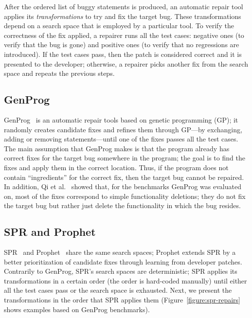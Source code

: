 After the ordered list of buggy statements is produced, an automatic repair tool applies its \emph{transformations} to try and fix the target bug. These transformations depend on a search space that is employed by a particular tool. To verify the correctness of the fix applied, a repairer runs all the test cases: negative ones (to verify that the bug is gone) and positive ones (to verify that no regressions are introduced). If the test cases pass, then the patch is considered correct and it is presented to the developer; otherwise, a repairer picks another fix from the search space and repeats the previous steps.

\subsection{GenProg}

GenProg~\cite{le2012systematic} is an automatic repair tools based on genetic programming (GP); it randomly creates candidate fixes and refines them through GP---by exchanging, adding or removing statements---until one of the fixes passes all the test cases. The main assumption that GenProg makes is that the program already has correct fixes for the target bug somewhere in the program; the goal is to find the fixes and apply them in the correct location. Thus, if the program does not contain ``ingredients'' for the correct fix, then the target bug cannot be repaired. In addition, Qi et al.~\cite{qi2015analysis} showed that, for the benchmarks GenProg was evaluated on, most of the fixes correspond to simple functionality deletions; they do not fix the target bug but rather just delete the functionality in which the bug resides.

\subsection{SPR and Prophet}

SPR~\cite{long2015staged} and Prophet~\cite{long2015prophet} share the same search spaces; Prophet extends SPR by a better prioritization of candidate fixes through learning from developer patches. Contrarily to GenProg, SPR's search spaces are deterministic; SPR applies its transformations in a certain order (the order is hard-coded manually) until either all the test cases pass or the search space is exhausted. Next, we present the transformations in the order that SPR applies them (Figure~\ref{figure:spr-repairs} shows examples based on GenProg benchmarks).


